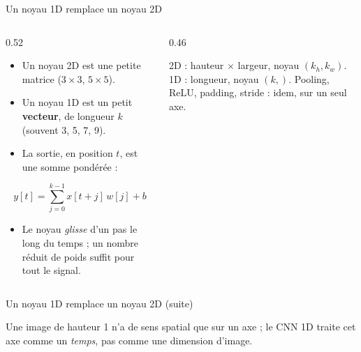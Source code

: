 \begin{frame}{Un noyau 1D remplace un noyau 2D}
\begin{columns}[t]
\begin{column}{0.52\textwidth}
\begin{itemize}
  \item Un noyau 2D est une petite matrice ($3 \times 3$, $5 \times 5$).
  \item Un noyau 1D est un petit \textbf{vecteur}, de longueur $k$
  (souvent 3, 5, 7, 9).
  \item La sortie, en position $t$, est une somme pondérée :
\end{itemize}
\[
y[t]=\sum_{j=0}^{k-1} x[t+j]\,w[j] + b
\]
\begin{itemize}
  \item Le noyau \emph{glisse} d'un pas le long du temps ; un nombre réduit
  de poids suffit pour tout le signal.
\end{itemize}
\end{column}
\begin{column}{0.46\textwidth}
\begin{kbox}
2D : hauteur $\times$ largeur, noyau $(k_h, k_w)$.\newline
1D : longueur, noyau $(k,)$.\newline
Pooling, ReLU, padding, stride : idem, sur un seul axe.
\end{kbox}

\end{column}
\end{columns}
\end{frame}
\begin{frame}{Un noyau 1D remplace un noyau 2D (suite)}
\begin{wbox}
Une image de hauteur 1 n'a de sens spatial que sur un axe ; le CNN 1D traite
cet axe comme un \emph{temps}, pas comme une dimension d'image.
\end{wbox}
\end{frame}

